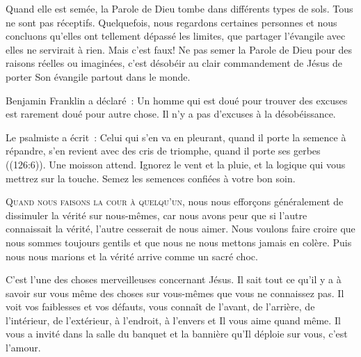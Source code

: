Quand elle est semée, la Parole de Dieu tombe dans différents types de sols.
 Tous ne sont pas réceptifs.
 Quelquefois, nous regardons certaines personnes et nous concluons
 qu'elles ont tellement dépassé les limites, que partager l'évangile 
 avec elles ne servirait à rien. Mais c'est faux!
 Ne pas semer la Parole de Dieu pour des raisons réelles ou imaginées,
 c'est désobéir au clair commandement de Jésus de porter Son évangile 
 partout dans le monde. 

Benjamin Franklin a déclaré~: 
 \og Un homme qui est doué pour trouver des excuses est rarement doué
 pour autre chose. \fg{} Il n'y a pas d'excuses à la désobéissance. 


Le psalmiste a écrit~: 
 \og Celui qui s'en va en pleurant, quand il porte la semence à répandre,
 s'en revient avec des cris de triomphe, quand il porte ses gerbes \fg{} 
 ((126:6)). Une moisson attend. Ignorez le vent et la pluie,
 et la logique qui vous mettrez sur la touche.
 Semez les semences confiées à votre bon soin.

\dvrule






\lettrine{Q}{uand nous faisons la cour à quelqu'un,}
 nous nous efforçons généralement de dissimuler la vérité sur nous-mêmes,
 car nous avons peur que si l'autre connaissait la vérité,
 l'autre cesserait de nous aimer.
 Nous voulons faire croire que nous sommes toujours gentils
 et que nous ne nous mettons jamais en colère.
 Puis nous nous marions et la vérité arrive comme un sacré choc. 

C'est l'une des choses merveilleuses concernant Jésus.
 Il sait tout ce qu'il y a à savoir sur vous
 \ocadr même des choses sur vous-mêmes que vous ne connaissez pas.
 Il voit vos faiblesses et vos défauts, vous connaît de l'avant,
 de l'arrière, de l'intérieur, de l'extérieur, à l'endroit,
 à l'envers et Il vous aime quand même.
 Il vous a invité dans la salle du banquet et la bannière
 qu'Il déploie sur vous, c'est l'amour.


